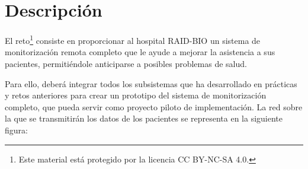 \documentclass{upmassignment} \usepackage[spanish]{babel} \usepackage{ifthen} \usepackage{amsmath} \usepackage{amsfonts} \usepackage{booktabs}
\begin{document}
\section*{Descripción}

El reto\footnote{Este material está protegido por la
licencia
CC BY-NC-SA 4.0.
\byncsa
} consiste en proporcionar al hospital RAID-BIO un sistema de monitorización remota completo que le ayude a mejorar la asistencia a sus pacientes, permitiéndole anticiparse a posibles problemas de salud. 

Para ello, deberá integrar todos los subsistemas que ha desarrollado en prácticas y retos anteriores para crear un prototipo del sistema de monitorización completo, que pueda servir como proyecto piloto de implementación. La red sobre la que se transmitirán los datos de los pacientes se representa en la siguiente figura: 
\end{document}

